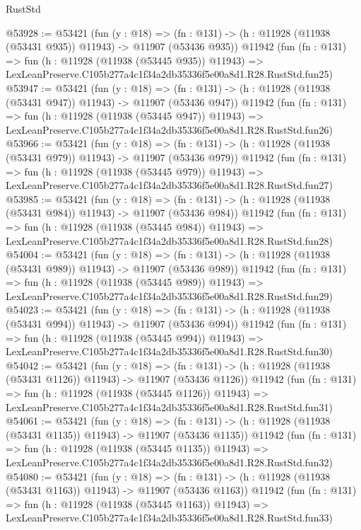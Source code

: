 \begin{lexlean}{RustStd}
\begin{coremodule}
@53928 := @53421
    (fun (y : @18) =>
    (fn : @131) -> (h : @11928 (@11938 (@53431 @935)) @11943) -> @11907 (@53436 @935))
    @11942
    (fun (fn : @131) =>
    fun (h : @11928 (@11938 (@53445 @935)) @11943) =>
    LexLeanPreserve.C105b277a4c1f34a2db35336f5e00a8d1.R28.RustStd.fun25)
@53947 := @53421
    (fun (y : @18) =>
    (fn : @131) -> (h : @11928 (@11938 (@53431 @947)) @11943) -> @11907 (@53436 @947))
    @11942
    (fun (fn : @131) =>
    fun (h : @11928 (@11938 (@53445 @947)) @11943) =>
    LexLeanPreserve.C105b277a4c1f34a2db35336f5e00a8d1.R28.RustStd.fun26)
@53966 := @53421
    (fun (y : @18) =>
    (fn : @131) -> (h : @11928 (@11938 (@53431 @979)) @11943) -> @11907 (@53436 @979))
    @11942
    (fun (fn : @131) =>
    fun (h : @11928 (@11938 (@53445 @979)) @11943) =>
    LexLeanPreserve.C105b277a4c1f34a2db35336f5e00a8d1.R28.RustStd.fun27)
@53985 := @53421
    (fun (y : @18) =>
    (fn : @131) -> (h : @11928 (@11938 (@53431 @984)) @11943) -> @11907 (@53436 @984))
    @11942
    (fun (fn : @131) =>
    fun (h : @11928 (@11938 (@53445 @984)) @11943) =>
    LexLeanPreserve.C105b277a4c1f34a2db35336f5e00a8d1.R28.RustStd.fun28)
@54004 := @53421
    (fun (y : @18) =>
    (fn : @131) -> (h : @11928 (@11938 (@53431 @989)) @11943) -> @11907 (@53436 @989))
    @11942
    (fun (fn : @131) =>
    fun (h : @11928 (@11938 (@53445 @989)) @11943) =>
    LexLeanPreserve.C105b277a4c1f34a2db35336f5e00a8d1.R28.RustStd.fun29)
@54023 := @53421
    (fun (y : @18) =>
    (fn : @131) -> (h : @11928 (@11938 (@53431 @994)) @11943) -> @11907 (@53436 @994))
    @11942
    (fun (fn : @131) =>
    fun (h : @11928 (@11938 (@53445 @994)) @11943) =>
    LexLeanPreserve.C105b277a4c1f34a2db35336f5e00a8d1.R28.RustStd.fun30)
@54042 := @53421
    (fun (y : @18) =>
    (fn : @131) -> (h : @11928 (@11938 (@53431 @1126)) @11943) -> @11907 (@53436 @1126))
    @11942
    (fun (fn : @131) =>
    fun (h : @11928 (@11938 (@53445 @1126)) @11943) =>
    LexLeanPreserve.C105b277a4c1f34a2db35336f5e00a8d1.R28.RustStd.fun31)
@54061 := @53421
    (fun (y : @18) =>
    (fn : @131) -> (h : @11928 (@11938 (@53431 @1135)) @11943) -> @11907 (@53436 @1135))
    @11942
    (fun (fn : @131) =>
    fun (h : @11928 (@11938 (@53445 @1135)) @11943) =>
    LexLeanPreserve.C105b277a4c1f34a2db35336f5e00a8d1.R28.RustStd.fun32)
@54080 := @53421
    (fun (y : @18) =>
    (fn : @131) -> (h : @11928 (@11938 (@53431 @1163)) @11943) -> @11907 (@53436 @1163))
    @11942
    (fun (fn : @131) =>
    fun (h : @11928 (@11938 (@53445 @1163)) @11943) =>
    LexLeanPreserve.C105b277a4c1f34a2db35336f5e00a8d1.R28.RustStd.fun33)

\end{coremodule}
\end{lexlean}
